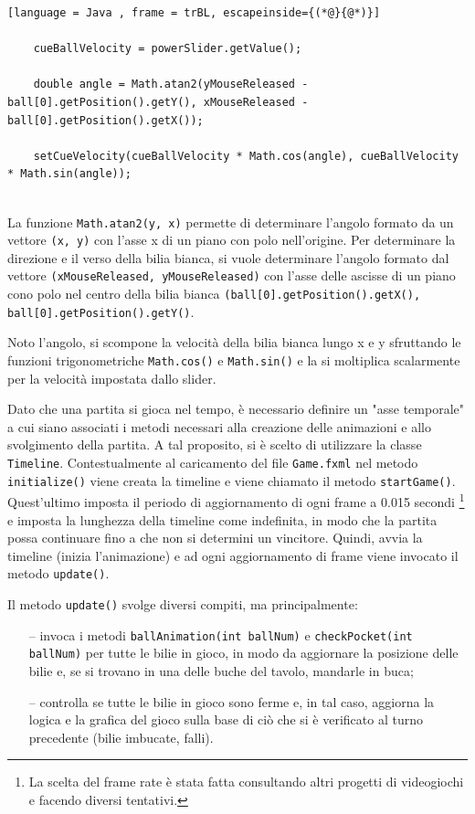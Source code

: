 \documentclass[12pt,a4paper]{report}
\begin{document}
\begin{lstlisting}[language = Java , frame = trBL, escapeinside={(*@}{@*)}]

	cueBallVelocity = powerSlider.getValue();
	
    double angle = Math.atan2(yMouseReleased - ball[0].getPosition().getY(), xMouseReleased - ball[0].getPosition().getX());
    
	setCueVelocity(cueBallVelocity * Math.cos(angle), cueBallVelocity * Math.sin(angle));
	
\end{lstlisting}

La funzione \texttt{Math.atan2(y, x)} permette di determinare l'angolo formato da un vettore \texttt{(x, y)} con l'asse x di un piano con polo nell'origine.
Per determinare la direzione e il verso della bilia bianca, si vuole determinare l'angolo formato dal vettore \texttt{(xMouseReleased, yMouseReleased)} con l'asse delle ascisse di un piano cono polo nel centro della bilia bianca \texttt{(ball[0].getPosition().getX(), ball[0].getPosition().getY()}.

Noto l'angolo, si scompone la velocità della bilia bianca lungo x e y sfruttando le funzioni trigonometriche \texttt{Math.cos()} e \texttt{Math.sin()} e la si moltiplica scalarmente per la velocità impostata dallo slider.

\vspace{3mm}

Dato che una partita si gioca nel tempo, è necessario definire un "asse temporale" a cui siano associati i metodi necessari alla creazione delle animazioni e allo svolgimento della partita.
A tal proposito, si è scelto di utilizzare la classe \texttt{Timeline}.
Contestualmente al caricamento del file \texttt{Game.fxml} nel metodo \texttt{initialize()} viene creata la timeline e viene chiamato il metodo \texttt{startGame()}.
Quest'ultimo imposta il periodo di aggiornamento di ogni frame a 0.015 secondi \footnote{La scelta del frame rate è stata fatta consultando altri progetti di videogiochi e facendo diversi tentativi.} e imposta la lunghezza della timeline come indefinita, in modo che la partita possa continuare fino a che non si determini un vincitore.
Quindi, avvia la timeline (inizia l'animazione) e ad ogni aggiornamento di frame viene invocato il metodo \texttt{update()}.

\vspace{3mm}

Il metodo \texttt{update()} svolge diversi compiti, ma principalmente:
\begin{itemize}
	\item [--] invoca i metodi \texttt{ballAnimation(int ballNum)} e \texttt{checkPocket(int ballNum)} per tutte le bilie in gioco, in modo da aggiornare la posizione delle bilie e, se si trovano in una delle buche del tavolo, mandarle in buca;
	\item [--] controlla se tutte le bilie in gioco sono ferme e, in tal caso, aggiorna la logica e la grafica del gioco sulla base di ciò che si è verificato al turno precedente (bilie imbucate, falli).
\end{itemize}
\end{document}
